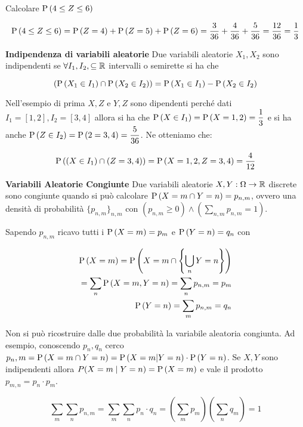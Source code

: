 \begin{exmp}
	Calcolare $ \text{P}\left(4 \leq Z \leq 6\right) $
	
	\begin{equation*}
	\text{P}\left(4 \leq Z \leq 6\right) = \text{P}\left(Z = 4\right) + \text{P}\left(Z = 5\right) + \text{P}\left(Z = 6\right) = \dfrac{3}{36} + \dfrac{4}{36} + \dfrac{5}{36} = \dfrac{12}{36} = \dfrac{1}{3}
	\end{equation*}
\end{exmp}		


\begin{defn}
	\textbf{Indipendenza di variabili aleatorie}
	Due variabili aleatorie $ X_1, X_2 $ sono indipendenti se $ \forall I_1, I_2, \subseteq \mathbb{R} $ intervalli o semirette si ha che 
	
	\begin{equation*}
	\left( \text{P}\left(X_1 \in I_1\right) \cap \text{P}\left(X_2 \in I_2\right) \right) = \text{P}\left(X_1 \in I_1\right) - \text{P}\left(X_2 \in I_2\right)
	\end{equation*}
	
	Nell'esempio di prima $ X, Z $ e $ Y,Z $ sono dipendenti perché dati $ I_1 = [1,2], I_2 = [3,4] $ allora si ha che $ \text{P}\left(X\in I_1\right) = \text{P}\left(X=1,2\right) = \dfrac{1}{3} $ e si ha anche $ \text{P}\left(Z \in I_2\right) = \text{P}\left(2 = 3,4\right) = \dfrac{5}{36} $. Ne otteniamo che:
	
	
	\begin{equation*}
	\text{P}\left((X \in I_1) \cap (Z = 3,4)\right) = \text{P}\left(X = 1,2, Z = 3,4\right) = \dfrac{4}{12}
	\end{equation*}
		
\end{defn}

\begin{defn}
	\textbf{Variabili Aleatorie Congiunte}
	Due variabili aleatorie $ X,Y : \Omega \to \mathbb{R} $ discrete sono congiunte quando si può calcolare $ \text{P}\left(X = m \cap Y = n\right) = p_{n,m} $, ovvero una densità di probabilità $ \{ p_{n,m} \}_{n,m} $ con $ (p_{n,m} \geq 0 ) \land (\sum_{n,m} p_{n,m} = 1) $.
	
	Sapendo $ p_{n,m} $ ricavo tutti i $ \text{P}\left(X=m\right) = p_m $ e $ \text{P}\left(Y = n\right) = q_n $ con
	
	\begin{equation*}
	\begin{aligned}
	\text{P}\left(X=m\right) = \text{P}\left(X = m \cap \left\{ \bigcup_{n} Y=n \right\}\right) \\ 
	= \sum_{n} \text{P}\left(X=m,Y=n\right) = \sum_n p_{n,m} = p_m \\
	\text{P}\left(Y=n\right) = \sum_{m} p_{n,m} = q_n
	\end{aligned}
	\end{equation*}
	
	Non si può ricostruire dalle due probabilità la variabile aleatoria congiunta. Ad esempio, conoscendo $ p_n,q_n $ cerco $ p_n,m  = \text{P}\left(X = m \cap Y = n\right) = \text{P}\left(X = m | Y = n\right) \cdot \text{P}\left(Y=n\right) $. Se $ X,Y $ sono indipendenti allora $ P(X=m \mid Y=n) = \text{P}\left(X=m\right) $ e vale il prodotto $ p_{m,n} = p_n \cdot p_m $.
	
	
	\begin{equation*}
	\sum_{m}\sum_{n} p_{n,m} = \sum_{m}\sum_{n} p_n \cdot q_n = \left( \sum_{m} p_m \right) \left( \sum_{n} q_m \right) = 1 
	\end{equation*}
\end{defn}


